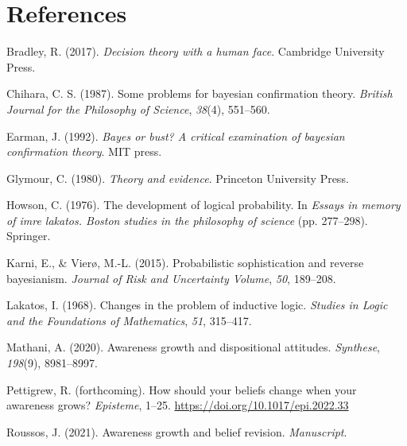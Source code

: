\documentclass[
  11pt,
  dvipsnames,enabledeprecatedfontcommands]{scrartcl}
\newlength{\cslhangindent}
\newlength{\cslentryspacingunit} %
\newenvironment{CSLReferences}[2] %
 {%
  \setlength{\parindent}{0pt}
  \ifodd #1
  \let\oldpar\par
  \def\par{\hangindent=\cslhangindent\oldpar}
  \fi
  \setlength{\parskip}{#2\cslentryspacingunit}
 }%
 {}
\begin{document}
\singlespace

\hypertarget{references}{%
\section*{References}\label{references}}

\hypertarget{refs}{}
\begin{CSLReferences}{1}{0}
\leavevmode{}%
Bradley, R. (2017). \emph{Decision theory with a human face}. Cambridge
University Press.

\leavevmode{}%
Chihara, C. S. (1987). Some problems for bayesian confirmation theory.
\emph{British Journal for the Philosophy of Science}, \emph{38}(4),
551--560.

\leavevmode{}%
Earman, J. (1992). \emph{Bayes or bust? A critical examination of
bayesian confirmation theory}. MIT press.

\leavevmode{}%
Glymour, C. (1980). \emph{Theory and evidence}. Princeton University
Press.

\leavevmode{}%
Howson, C. (1976). The development of logical probability. In
\emph{Essays in memory of imre lakatos. Boston studies in the philosophy
of science} (pp. 277--298). Springer.

\leavevmode{}%
Karni, E., \& Vierø, M.-L. (2015). Probabilistic sophistication and
reverse bayesianism. \emph{Journal of Risk and Uncertainty Volume},
\emph{50}, 189--208.

\leavevmode{}%
Lakatos, I. (1968). Changes in the problem of inductive logic.
\emph{Studies in Logic and the Foundations of Mathematics}, \emph{51},
315--417.

\leavevmode{}%
Mathani, A. (2020). Awareness growth and dispositional attitudes.
\emph{Synthese}, \emph{198}(9), 8981--8997.

\leavevmode{}%
Pettigrew, R. (forthcoming). How should your beliefs change when your
awareness grows? \emph{Episteme}, 1--25.
\url{https://doi.org/10.1017/epi.2022.33}

\leavevmode{}%
Roussos, J. (2021). Awareness growth and belief revision.
\emph{Manuscript}.


\end{CSLReferences}
\end{document}
